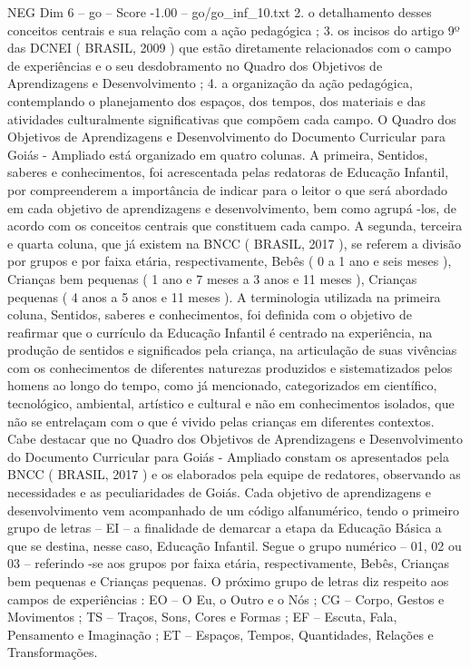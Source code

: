 \begin{textsample}{NEG Dim 6 – go – Score -1.00 – go/go\_inf\_10.txt}  \label{ex:f6_neg_176}
2. o detalhamento desses conceitos centrais e sua relação com a ação pedagógica ; 3. os incisos do artigo 9º das DCNEI ( BRASIL, 2009 ) que estão diretamente relacionados com o campo de experiências e o seu desdobramento no Quadro dos Objetivos de Aprendizagens e Desenvolvimento ; 4. a organização da ação pedagógica, contemplando o planejamento dos espaços, dos tempos, dos materiais e das atividades culturalmente significativas que compõem cada campo.
O Quadro dos Objetivos de Aprendizagens e Desenvolvimento do Documento Curricular para Goiás - Ampliado está organizado em quatro colunas.
A primeira, Sentidos, saberes e conhecimentos, foi acrescentada pelas redatoras de Educação Infantil, por compreenderem a importância de indicar para o leitor o que será abordado em cada objetivo de aprendizagens e desenvolvimento, bem como agrupá -los, de acordo com os conceitos centrais que constituem cada campo.
A segunda, terceira e quarta coluna, que já existem na BNCC ( BRASIL, 2017 ), se referem a divisão por grupos e por faixa etária, respectivamente, Bebês ( 0 a 1 ano e seis meses ), Crianças bem pequenas ( 1 ano e 7 meses a 3 anos e 11 meses ), Crianças pequenas ( 4 anos a 5 anos e 11 meses ).
A terminologia utilizada na primeira coluna, Sentidos, saberes e conhecimentos, foi definida com o objetivo de reafirmar que o currículo da Educação Infantil é centrado na experiência, na produção de sentidos e significados pela criança, na articulação de suas vivências com os conhecimentos de diferentes naturezas produzidos e sistematizados pelos homens ao longo do tempo, como já mencionado, categorizados em científico, tecnológico, ambiental, artístico e cultural e não em conhecimentos isolados, que não se entrelaçam com o que é vivido pelas crianças em diferentes contextos.
Cabe destacar que no Quadro dos Objetivos de Aprendizagens e Desenvolvimento do Documento Curricular para Goiás - Ampliado constam os apresentados pela BNCC ( BRASIL, 2017 ) e os elaborados pela equipe de redatores, observando as necessidades e as peculiaridades de Goiás.
Cada objetivo de aprendizagens e desenvolvimento vem acompanhado de um código alfanumérico, tendo o primeiro grupo de letras – EI – a finalidade de demarcar a etapa da Educação Básica a que se destina, nesse caso, Educação Infantil.
Segue o grupo numérico – 01, 02 ou 03 – referindo -se aos grupos por faixa etária, respectivamente, Bebês, Crianças bem pequenas e Crianças pequenas.
O próximo grupo de letras diz respeito aos campos de experiências : EO – O Eu, o Outro e o Nós ; CG – Corpo, Gestos e Movimentos ; TS – Traços, Sons, Cores e Formas ; EF – Escuta, Fala, Pensamento e Imaginação ; ET – Espaços, Tempos, Quantidades, Relações e Transformações.

\end{textsample}
